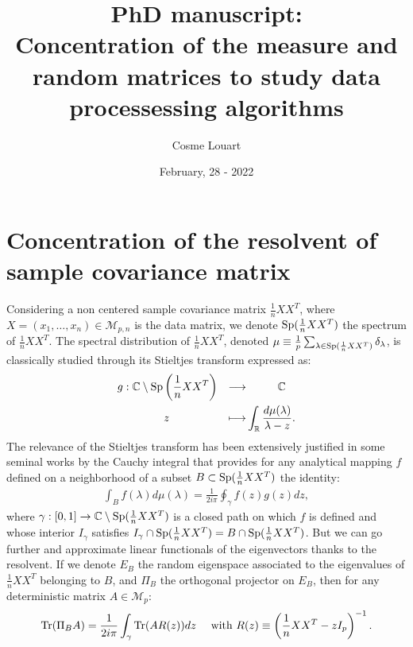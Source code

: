\documentclass[a4papaer, titlepage]{book}
\title{PhD manuscript:\\
Concentration of the measure and random matrices to study data processessing algorithms}
\author{Cosme Louart}
\date{February, 28 - 2022}
\begin{document}
\maketitle
\frontmatter


\mainmatter

\part{Concentration of the resolvent of sample covariance matrix}\label{prt:resolvent}
Considering a non centered sample covariance matrix $\frac{1}{n}XX^T$, where $X = (x_1,\ldots, x_n) \in \mathcal M_{p,n}$ is the data matrix, we denote $\operatorname{Sp}(\frac{1}{n}XX^T)$ the spectrum of $\frac{1}{n}XX^T$.
The spectral distribution of $\frac{1}{n}XX^T$, denoted $\mu \equiv  \frac{1}{p}\sum_{\lambda \in \operatorname{Sp}(\frac{1}{n}XX^T)} \delta_{\lambda}$, is classically studied through its Stieltjes transform expressed as:
\begin{align*}
  g : \begin{aligned}[t]
    &\mathbb C \setminus \operatorname{Sp} \left(\frac{1}{n}XX^T\right) &\longrightarrow& \hspace{1cm}\mathbb C\\
    &\hspace{1cm} z &\longmapsto & \int_{\mathbb R} \frac{d\mu(\lambda)}{\lambda - z} .
  \end{aligned}
\end{align*}
The relevance of the Stieltjes transform has been extensively justified in some seminal works \cite{MAR67,SIL86} by the Cauchy integral that provides for any analytical mapping $f$ defined on a neighborhood of a subset $B\subset \operatorname{Sp}(\frac{1}{n}XX^T)$ the identity:
\begin{align*}
  \int_B f(\lambda) d\mu(\lambda) = \frac{1}{2i \pi} \oint_{\gamma} f(z)g(z) dz,
\end{align*}
where $\gamma: [0,1] \to \mathbb C \setminus \operatorname{Sp}(\frac{1}{n}XX^T)$ is a closed path on which $f$ is defined and whose interior $I_\gamma$ satisfies $I_\gamma \cap \operatorname{Sp}(\frac{1}{n}XX^T) = B \cap \operatorname{Sp}(\frac{1}{n}XX^T)$.
  But we can go further and approximate linear functionals of the eigenvectors thanks to the resolvent. If we denote $E_B$ the random eigenspace associated to the eigenvalues of $\frac{1}{n}XX^T$ belonging to $B$, and $\Pi_B$ the orthogonal projector on $E_B$, then for any deterministic matrix $A \in \mathcal M_{p}$:
 \begin{align}\label{eq:estimation_eigenspaces}
   \operatorname{Tr}(\Pi_BA) = \frac{1}{2i\pi}\int_\gamma \operatorname{Tr}(AR(z)) dz&
   &\text{ with } R(z) \equiv \left(\frac{1}{n}XX^T - z I_p\right)^{-1}.
 \end{align}
\end{document}
